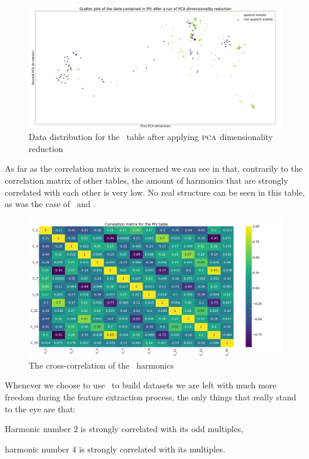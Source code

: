 \begin{figure}[h!]
	\centering
	\includegraphics[width=\linewidth]{img/Phi_distribution.png}
	\caption{Data distribution for the \phin\ table after applying $\textsc{pca}$ dimensionality
		reduction} \label{fig:phi-dist}
\end{figure}

\medskip

As far as the correlation matrix is concerned we can see in  that, contrarily to
the correlation matrix of other tables, the amount of harmonics that are strongly correlated with
each other is very low. No real structure can be seen in this table, as was the case of \an\ and \bn.
\begin{figure}[h!]
	\centering
	\includegraphics[width=\linewidth]{img/Phi_corr_matrix.png}
	\caption{The cross-correlation of the \phin\ harmonics} \label{fig:phi-corr}
\end{figure}
Whenever we choose to use \phin\ to build datasets we are left with much more freedom during the
feature extraction process, the only things that really stand to the eye are that:
\begin{inparaenum}[(i)]
	\item Harmonic number $2$ is strongly correlated with its odd multiples,
	\item harmonic number $4$ is strongly correlated with its multiples.
\end{inparaenum}

